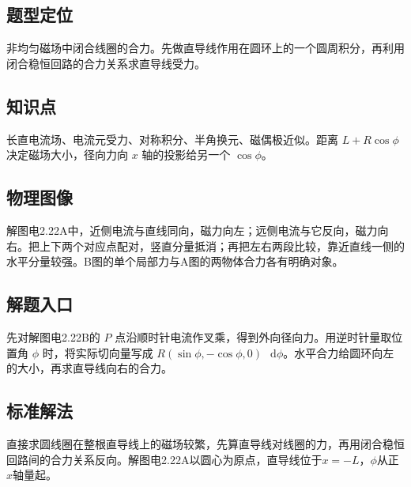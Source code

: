 \documentclass[UTF8,fontset=fandol,a4paper,11pt]{ctexart}
\newcommand{\dd}{\mathop{}\!\mathrm{d}}
\begin{document}


\subsection*{题型定位}

非均匀磁场中闭合线圈的合力。先做直导线作用在圆环上的一个圆周积分，再利用闭合稳恒回路的合力关系求直导线受力。



\subsection*{知识点}

长直电流场、电流元受力、对称积分、半角换元、磁偶极近似。距离 $L+R\cos\phi$ 决定磁场大小，径向力向 $x$ 轴的投影给另一个 $\cos\phi$。



\subsection*{物理图像}

解图电2.22A中，近侧电流与直线同向，磁力向左；远侧电流与它反向，磁力向右。把上下两个对应点配对，竖直分量抵消；再把左右两段比较，靠近直线一侧的水平分量较强。B图的单个局部力与A图的两物体合力各有明确对象。



\subsection*{解题入口}

先对解图电2.22B的 $P$ 点沿顺时针电流作叉乘，得到外向径向力。用逆时针量取位置角 $\phi$ 时，将实际切向量写成 $R(\sin\phi,-\cos\phi,0)\,\dd\phi$。水平合力给圆环向左的大小，再求直导线向右的合力。


\subsection*{标准解法}

直接求圆线圈在整根直导线上的磁场较繁，先算直导线对线圈的力，再用闭合稳恒回路间的合力关系反向。解图电2.22A以圆心为原点，直导线位于$x=-L$，$\phi$从正$x$轴量起。
\end{document}

